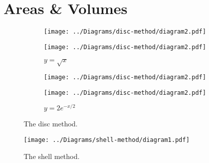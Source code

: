 \documentclass[oneside]{book}
\begin{document}
\section{Areas \& Volumes}
\begin{figure}[H]
  \centering
  \begin{subfigure}{0.9\textwidth}
    \centering
    \texttt{[image: ../Diagrams/disc-method/diagram2.pdf]}

    \texttt{[image: ../Diagrams/disc-method/diagram2.pdf]}
    \caption{\(y=\sqrt{x}\)}
    \label{fig:disc-quadratic}
\end{subfigure}%

\begin{subfigure}{0.9\textwidth}
    \centering
    \texttt{[image: ../Diagrams/disc-method/diagram2.pdf]}

    \texttt{[image: ../Diagrams/disc-method/diagram2.pdf]}
    \caption{\(y=2e^{-x/2}\)}
    \label{fig:disc-func}
\end{subfigure}
  \caption{The disc method.}
  \label{fig:disc}
\end{figure}
\begin{figure}[H]
  \centering
  \texttt{[image: ../Diagrams/shell-method/diagram1.pdf]}
  \caption{The shell method.}
  \label{fig:shell}
\end{figure}
\end{document}

